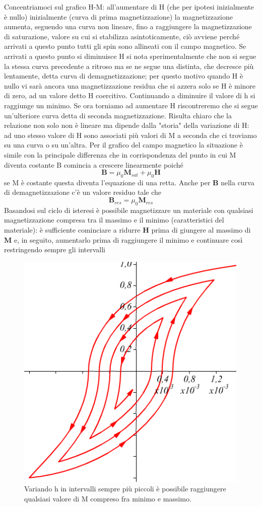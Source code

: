 \documentclass[
10pt, %
a4paper, %
oneside, %
headinclude,footinclude, %
BCOR5mm, %
]{scrartcl}
\begin{document}
\FloatBarrier
Concentriamoci sul grafico H-M: all'aumentare di H (che per ipotesi inizialmente è nullo) inizialmente (curva di prima magnetizzazione) la magnetizzazione aumenta, seguendo una curva non lineare, fino a raggiungere la magnetizzazione di saturazione, valore su cui si stabilizza asintoticamente, ciò avviene perché arrivati a questo punto tutti gli spin sono allineati con il campo magnetico. Se arrivati a questo punto si diminuisce H si nota sperimentalmente che non si segue la stessa curva precedente a ritroso ma se ne segue una distinta, che decresce più lentamente, detta curva di demagnetizzazione; per questo motivo quando H è nullo vi sarà ancora una magnetizzazione residua che si azzera solo se H è minore di zero, ad un valore detto H coercitivo. Continuando a diminuire il valore di h si raggiunge un minimo. Se ora torniamo ad aumentare H riscontreremo che si segue un'ulteriore curva detta di seconda magnetizzazione. Risulta chiaro che la relazione non solo non è lineare ma dipende dalla "storia" della variazione di H: ad uno stesso valore di H sono associati più valori di M a seconda che ci troviamo su una curva o su un'altra. Per il grafico del campo magnetico la situazione è simile con la principale differenza che in corrispondenza del punto in cui M diventa costante B comincia a crescere linearmente poiché
\[\mathbf{B} = \mu_0\mathbf{M}_{sat}+\mu_0\mathbf{H}\]
se M è costante questa diventa l'equazione di una retta. Anche per \(\mathbf{B}\) nella curva di demagnetizzazione c'è un valore residuo tale che
\[\mathbf{B}_{res} = \mu_0\mathbf{M}_{res}\] 
Basandosi sul ciclo di isteresi è possibile magnetizzare un materiale con qualsiasi magnetizzazione compresa tra il massimo e il minimo (caratteristici del materiale): è sufficiente cominciare a ridurre \(\mathbf{H}\) prima di giungere al massimo di \(\mathbf{M}\) e, in seguito, aumentarlo prima di raggiungere il minimo e continuare così restringendo sempre gli intervalli
\begin{figure}[h!]
	\centering
	\includegraphics[width=0.6\linewidth]{images/loop_isteresi}
	\caption{Variando h in intervalli sempre più piccoli è possibile raggiungere qualsiasi valore di M compreso fra minimo e massimo.}
	\label{fig:loopisteresi}
\end{figure}
\end{document}
